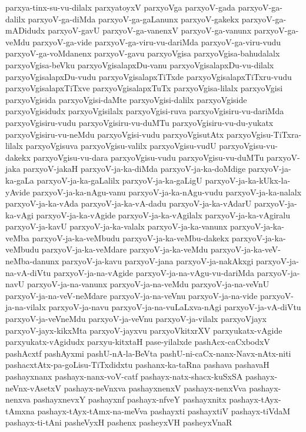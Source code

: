 {parxya-tinx-su-vu-dilalx
parxyatoyxV
parxyoVga
parxyoV-gada
parxyoV-ga-dalilx
parxyoV-ga-diMda
parxyoV-ga-gaLanunx
parxyoV-gakekx
parxyoV-ga-mADidudx
parxyoV-gavU
parxyoV-ga-vanenxV
parxyoV-ga-vanunx
parxyoV-ga-veMdu
parxyoV-ga-vide
parxyoV-ga-viru-vu-dariMda
parxyoV-ga-viru-vudu
parxyoV-ga-voMdanenx
parxyoV-gavu
parxyoVgisa
parxyoVgisa-bahudalalx
parxyoVgisa-beVku
parxyoVgisalapxDu-vanu
parxyoVgisalapxDu-vu-dilalx
parxyoVgisalapxDu-vudu
parxyoVgisalapxTiTxde
parxyoVgisalapxTiTxru-vudu
parxyoVgisalapxTiTxve
parxyoVgisalapxTuTx
parxyoVgisa-lilalx
parxyoVgisi
parxyoVgisida
parxyoVgisi-daMte
parxyoVgisi-dalilx
parxyoVgiside
parxyoVgisidudx
parxyoVgisilalx
parxyoVgisi-ruva
parxyoVgisiru-vu-dariMda
parxyoVgisiru-vudu
parxyoVgisiru-vu-duMTu
parxyoVgisiru-vu-du-yukatx
parxyoVgisiru-vu-neMdu
parxyoVgisi-vudu
parxyoVgisutAtx
parxyoVgisu-TiTxra-lilalx
parxyoVgisuva
parxyoVgisu-valilx
parxyoVgisu-vudU
parxyoVgisu-vu-dakekx
parxyoVgisu-vu-dara
parxyoVgisu-vudu
parxyoVgisu-vu-duMTu
parxyoV-jaka
parxyoV-jakaH
parxyoV-ja-ka-diMda
parxyoV-ja-ka-doMdige
parxyoV-ja-ka-gaLa
parxyoV-ja-ka-gaLalilx
parxyoV-ja-ka-gaLigU
parxyoV-ja-ka-kUkx-la-yAvide
parxyoV-ja-ka-nAgu-vanu
parxyoV-ja-ka-nAgu-vudu
parxyoV-ja-ka-nalalx
parxyoV-ja-ka-vAda
parxyoV-ja-ka-vA-dadu
parxyoV-ja-ka-vAdarU
parxyoV-ja-ka-vAgi
parxyoV-ja-ka-vAgide
parxyoV-ja-ka-vAgilalx
parxyoV-ja-ka-vAgiralu
parxyoV-ja-kavU
parxyoV-ja-ka-valalx
parxyoV-ja-ka-vanunx
parxyoV-ja-ka-veMba
parxyoV-ja-ka-veMbudu
parxyoV-ja-ka-veMbu-dakekx
parxyoV-ja-ka-veMbudu
parxyoV-ja-ka-veMdare
parxyoV-ja-ka-veMdu
parxyoV-ja-ka-veV-neMba-danunx
parxyoV-ja-kavu
parxyoV-jana
parxyoV-ja-nakAkxgi
parxyoV-ja-na-vA-diVtu
parxyoV-ja-na-vAgide
parxyoV-ja-na-vAgu-vu-dariMda
parxyoV-ja-navU
parxyoV-ja-na-vanunx
parxyoV-ja-na-veMdu
parxyoV-ja-na-veVnU
parxyoV-ja-na-veV-neMdare
parxyoV-ja-na-veVnu
parxyoV-ja-na-vide
parxyoV-ja-na-vilalx
parxyoV-ja-navu
parxyoV-ja-na-vuLaLxva-nAgi
parxyoV-ja-vA-diVtu
parxyoV-ja-veVneMdu
parxyoV-ja-veVnu
parxyoV-ja-vilalx
parxyoVjayx
parxyoV-jayx-kikxMta
parxyoV-jayxvu
parxyoVkitxrXV
parxyukatx-vAgide
parxyukatx-vAgidudx
parxyu-kitxtaH
pase-yilalxde
pashAcx-caCxbodxV
pashAcxtf
pashAyxmi
pashU-nA-la-BeVta
pashU-ni-caCx-nanx-Navx-nAtx-niti
pashacxtAtx-pa-goLisu-TiTxdidxtu
pashanx-ka-taRna
pashava
pashavaH
pashayxnanx
pashayx-nanx-voV-catf
pashayx-natx-shacx-kuSxSA
pashayx-neVnx-vAsetxV
pashayx-neVnxva
pashayxnenxV
pashayx-nenxVva
pashayx-nenxva
pashayxnevxY
pashayxnf
pashayx-nfveY
pashayxnitx
pashayx-tAyx-tAmxna
pashayx-tAyx-tAmx-na-meVva
pashayxti
pashayxtiV
pashayx-tiVdaM
pashayx-ti-tAni
pasheVyxH
pashenx
pasheyxVH
pasheyxVnaR
}
